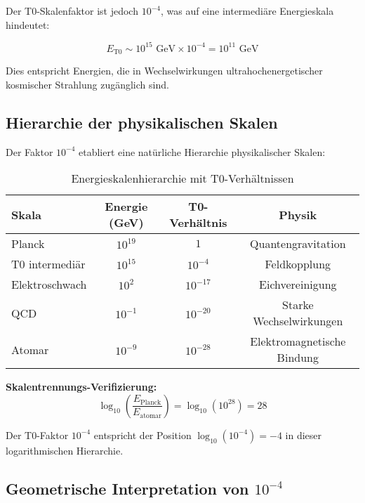 \documentclass[12pt,a4paper]{report}
\begin{document}
	Der T0-Skalenfaktor ist jedoch $10^{-4}$, was auf eine intermediäre Energieskala hindeutet:
	
	\begin{equation}
		E_{\text{T0}} \sim 10^{15} \text{ GeV} \times 10^{-4} = 10^{11} \text{ GeV}
	\end{equation}
	
	Dies entspricht Energien, die in Wechselwirkungen ultrahochenergetischer kosmischer Strahlung zugänglich sind.
	
	\subsection{Hierarchie der physikalischen Skalen}
	\label{subsec:hierarchy_scales}
	
	Der Faktor $10^{-4}$ etabliert eine natürliche Hierarchie physikalischer Skalen:
	
	\begin{table}[htbp]
		\centering
		\begin{tabular}{lccc}
			\toprule
			\textbf{Skala} & \textbf{Energie (GeV)} & \textbf{T0-Verhältnis} & \textbf{Physik} \\
			\midrule
			Planck & $10^{19}$ & $1$ & Quantengravitation \\
			T0 intermediär & $10^{15}$ & $10^{-4}$ & Feldkopplung \\
			Elektroschwach & $10^{2}$ & $10^{-17}$ & Eichvereinigung \\
			QCD & $10^{-1}$ & $10^{-20}$ & Starke Wechselwirkungen \\
			Atomar & $10^{-9}$ & $10^{-28}$ & Elektromagnetische Bindung \\
			\bottomrule
		\end{tabular}
		\caption{Energieskalenhierarchie mit T0-Verhältnissen}
		\label{tab:energy_hierarchy}
	\end{table}
	
	\textbf{Skalentrennungs-Verifizierung:}
	\begin{equation}
		\log_{10}\left(\frac{E_{\text{Planck}}}{E_{\text{atomar}}}\right) = \log_{10}(10^{28}) = 28
	\end{equation}
	
	Der T0-Faktor $10^{-4}$ entspricht der Position $\log_{10}(10^{-4}) = -4$ in dieser logarithmischen Hierarchie.
	
	\subsection{Geometrische Interpretation von $10^{-4}$}
	\label{subsec:geometric_interpretation}
	
\end{document}

